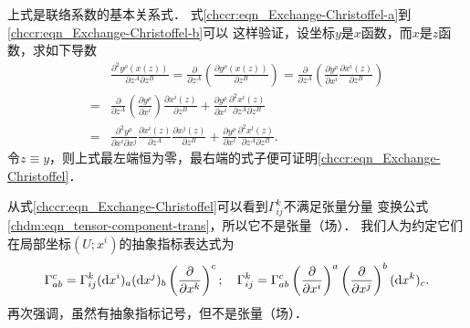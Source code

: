 上式是联络系数的基本关系式．
式\eqref{chccr:eqn_Exchange-Christoffel-a}到\eqref{chccr:eqn_Exchange-Christoffel-b}可以
这样验证，设坐标$y$是$x$函数，而$x$是$z$函数，求如下导数
\begin{equation} \label{chccr:eqn_tmp21}
\begin{aligned}
    &\frac{{{\partial ^2}{y^\rho }\left( {x\left( z \right)} \right)}}{{\partial {z^A}\partial {z^B}}}
     = \frac{\partial }{{\partial {z^A}}}\left( {\frac{{\partial {y^\rho }
                \left( {x\left( z \right)} \right)}}{{\partial {z^B}}}} \right)
             = \frac{\partial }{{\partial {z^A}}}\left( {\frac{{\partial {y^\rho }}}
                 {{\partial {x^i}}}\frac{{\partial {x^i}\left( z \right)}}{{\partial {z^B}}}} \right)\\
    =& \frac{\partial }{{\partial {z^A}}}\left( {\frac{{\partial {y^\rho }}}
        {{\partial {x^i}}}} \right)\frac{{\partial {x^i}\left( z \right)}}{{\partial {z^B}}}
    + \frac{{\partial {y^\rho }}}{{\partial {x^i}}}\frac{{{\partial ^2}{x^i}
            \left( z \right)}}{{\partial {z^A}\partial {z^B}}} \\
    =& \frac{{{\partial ^2}{y^\rho }}}{{\partial {x^i}\partial {x^j}}}
    \frac{{\partial {x^i}\left( z \right)}}{{\partial {z^A}}}
    \frac{{\partial {x^j}\left( z \right)}}{{\partial {z^B}}}
     + \frac{{\partial {y^\rho }}}{{\partial {x^l}}}\frac{{{\partial ^2}{x^l}
             \left( z \right)}}{{\partial {z^A}\partial {z^B}}} .
\end{aligned}\end{equation}
令$z\equiv y$，则上式最左端恒为零，最右端的式子便可证明\eqref{chccr:eqn_Exchange-Christoffel}．

从式\eqref{chccr:eqn_Exchange-Christoffel}可以看到$\Gamma^{k}_{ij}$不满足张量分量
变换公式\eqref{chdm:eqn_tensor-component-trans}，所以它不是张量（场）．
我们人为约定它们在局部坐标$(U;x^i)$的抽象指标表达式为
\begin{equation}\label{chccr:eqn_Christoffel-naturalbases-ij}
    \Gamma_{ab}^c = \Gamma_{ij}^k ({\rm d}x^i)_a ({\rm d}x^j)_b
    \left(\frac{\partial}{\partial x^k} \right)^c; \quad
    \Gamma_{ij}^k  = \Gamma_{ab}^c  \left(\frac{\partial}{\partial x^i} \right)^a
    \left(\frac{\partial}{\partial x^j} \right)^b ({\rm d}x^k)_c .
\end{equation}
再次强调，虽然有抽象指标记号，但不是张量（场）．

